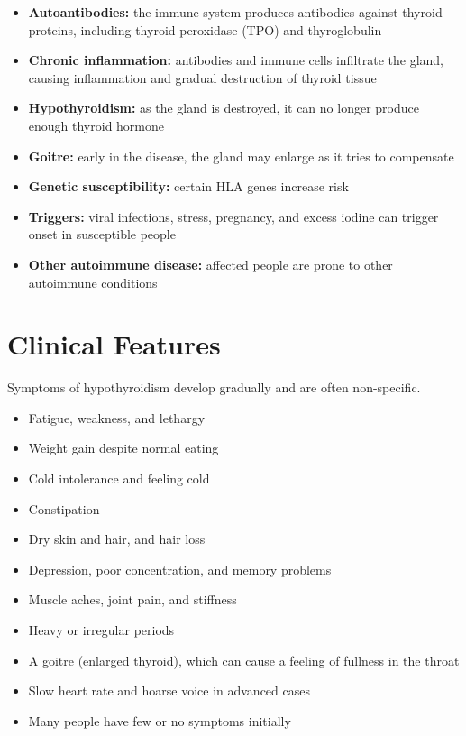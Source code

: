 \begin{itemize}
    \item \textbf{Autoantibodies:} the immune system produces antibodies against thyroid proteins, including thyroid peroxidase (TPO) and thyroglobulin
    \item \textbf{Chronic inflammation:} antibodies and immune cells infiltrate the gland, causing inflammation and gradual destruction of thyroid tissue
    \item \textbf{Hypothyroidism:} as the gland is destroyed, it can no longer produce enough thyroid hormone
    \item \textbf{Goitre:} early in the disease, the gland may enlarge as it tries to compensate
    \item \textbf{Genetic susceptibility:} certain HLA genes increase risk
    \item \textbf{Triggers:} viral infections, stress, pregnancy, and excess iodine can trigger onset in susceptible people
    \item \textbf{Other autoimmune disease:} affected people are prone to other autoimmune conditions
\end{itemize}

\section*{Clinical Features}
Symptoms of hypothyroidism develop gradually and are often non-specific.

\begin{itemize}
    \item Fatigue, weakness, and lethargy
    \item Weight gain despite normal eating
    \item Cold intolerance and feeling cold
    \item Constipation
    \item Dry skin and hair, and hair loss
    \item Depression, poor concentration, and memory problems
    \item Muscle aches, joint pain, and stiffness
    \item Heavy or irregular periods
    \item A goitre (enlarged thyroid), which can cause a feeling of fullness in the throat
    \item Slow heart rate and hoarse voice in advanced cases
    \item Many people have few or no symptoms initially
\end{itemize}

